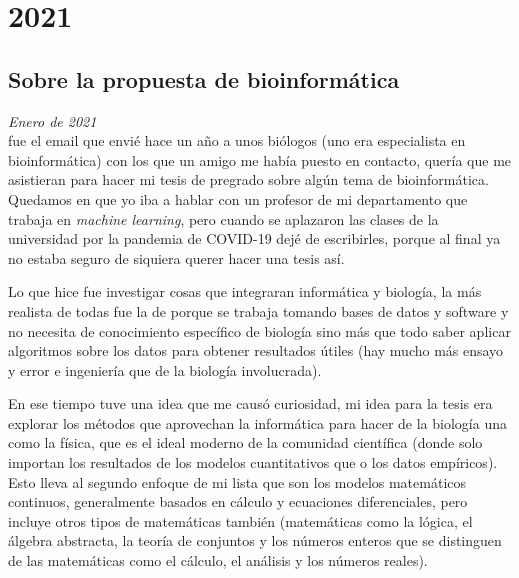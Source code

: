 \documentclass[12pt]{article}
\begin{document}
	\newpage

	\section{2021}

	\subsection{Sobre la propuesta de bioinformática}

	\textit{Enero de 2021}\\

	 fue el
	email que envié hace un año a unos biólogos (uno era especialista en
	bioinformática) con los que un amigo me había puesto en contacto, quería
	que me asistieran para hacer mi tesis de pregrado sobre algún tema de
	bioinformática. Quedamos en que yo iba a hablar con un profesor de mi
	departamento que trabaja en \textit{machine learning}, pero cuando se
	aplazaron las clases de la universidad por la pandemia de COVID-19 dejé
	de escribirles, porque al final ya no estaba seguro de siquiera querer
	hacer una tesis así.

	Lo que hice fue investigar cosas que integraran informática y biología,
	la más realista de todas fue la de 
	porque se trabaja tomando bases de datos y software y no necesita de
	conocimiento específico de biología sino más que todo saber aplicar
	algoritmos sobre los datos para obtener resultados útiles (hay mucho
	más ensayo y error e ingeniería que  de la
	biología involucrada).

	En ese tiempo tuve una idea que me causó curiosidad, mi idea para la
	tesis era explorar los métodos que aprovechan la informática para hacer
	de la biología una  como la física, que
	es el ideal moderno de la comunidad científica (donde solo importan los
	resultados de los modelos cuantitativos que  o
	 los datos empíricos). Esto lleva al segundo enfoque
	de mi lista que son los modelos matemáticos continuos, generalmente
	basados en cálculo y ecuaciones diferenciales, pero incluye otros tipos
	de matemáticas también (matemáticas  como la lógica,
	el álgebra abstracta, la teoría de conjuntos y los números enteros que
	se distinguen de las matemáticas  como el cálculo,
	el análisis y los números reales).
\end{document}

